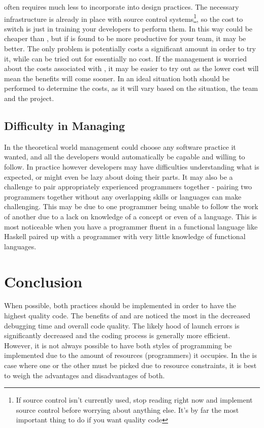 \documentclass{article}
\begin{document}
\CR often requires much less to incorporate into design practices. The necessary infrastructure is already in place with source control systems\footnote{If source control isn't currently used, stop reading right now and implement source control before worrying about anything else. It's by far the most important thing to do if you want quality code}, so the cost to switch is just in training your developers to perform them. In this way \CR could be cheaper than \PP, but if \PP is found to be more productive for your team, it may be better. The only problem is \PP potentially costs a significant amount in order to try it, while \CR can be tried out for essentially no cost. If the management is worried about the costs associated with \PP, it may be easier to try out \CR as the lower cost will mean the benefits will come sooner. In an ideal situation both should be performed to determine the costs, as it will vary based on the situation, the team and the project.


\subsection{Difficulty in Managing}

In the theoretical world management could choose any software practice it wanted, and all the developers would automatically be capable and willing to follow. In practice however developers may have difficulties understanding what is expected, or might even be lazy about doing their parts. It may also be a challenge to pair appropriately experienced programmers together - pairing two programmers together without any overlapping skills or languages can make \PP challenging. This may be due to one programmer being unable to follow the work of another due to a lack on knowledge of a concept or even of a language. This is most noticeable when you have a  programmer fluent in a functional language like Haskell paired up with a programmer with very little knowledge of functional languages.

\section{Conclusion}

When possible, both practices should be implemented in order to have the highest quality code. The benefits of \PP and \CR are noticed the most in the decreased debugging time and overall code quality. The likely hood of launch errors is significantly decreased and the coding process is generally more efficient. However, it is not always possible to have both styles of programming be implemented due to the amount of resources (programmers) it occupies. In the is case where one or the other must be picked due to resource constraints, it is best to weigh the advantages and disadvantages of both.
\end{document}
